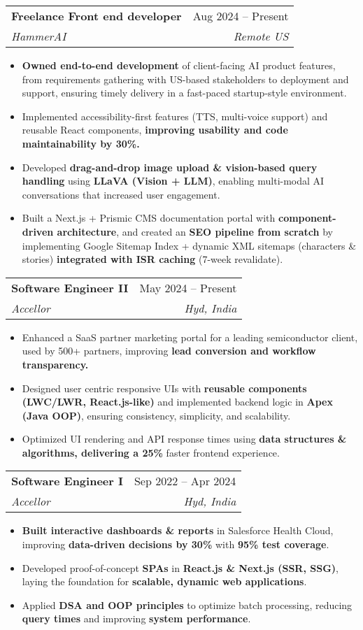 \documentclass[letterpaper,11pt]{article}
\makeatletter
\newcommand{\resumeItem}[1]{
  \item\small{
    {#1 \vspace{-2pt}}
  }
}
\newcommand{\resumeSubheading}[4]{
  \vspace{-2pt}\item
    \begin{tabular*}{0.97\textwidth}[t]{l@{\extracolsep{\fill}}r}
      \textbf{#1} & #2 \\
      \textit{\small#3} & \textit{\small #4} \\
    \end{tabular*}\vspace{-7pt}
}
\newcommand{\resumeSubSubheading}[2]{
    \item
    \begin{tabular*}{0.97\textwidth}{l@{\extracolsep{\fill}}r}
      \textit{\small#1} & \textit{\small #2} \\
    \end{tabular*}\vspace{-7pt}
}
\newcommand{\resumeSubHeadingListEnd}{\end{itemize}}
\newcommand{\resumeItemListStart}{\begin{itemize}}
\newcommand{\resumeItemListEnd}{\end{itemize}\vspace{-5pt}}
\makeatother
\begin{document}
    \resumeSubheading
      {Freelance Front end developer}{Aug 2024 -- Present}
      {HammerAI}{Remote US}
      \resumeItemListStart
        \resumeItem{\textbf{Owned end-to-end development} of client-facing AI product features, from requirements gathering with US-based stakeholders to deployment and support, ensuring timely delivery in a fast-paced startup-style environment.}
        \resumeItem{Implemented accessibility-first features (TTS, multi-voice support) and reusable React components, \textbf{improving usability and code maintainability by 30\%.}}
        \resumeItem{Developed \textbf{drag-and-drop image upload \& vision-based query handling} using \textbf{LLaVA (Vision + LLM)}, enabling multi-modal AI conversations that increased user engagement.}
        \resumeItem{Built a Next.js + Prismic CMS documentation portal with \textbf{component-driven architecture}, and created an \textbf{SEO pipeline from scratch} by implementing Google Sitemap Index + dynamic XML sitemaps (characters \& stories) \textbf{integrated with ISR caching} (7-week revalidate).}
     \resumeItemListEnd
    \resumeSubheading
      {Software Engineer II}{May 2024 -- Present}
      {Accellor}{Hyd, India}
      \resumeItemListStart
        \resumeItem{Enhanced a SaaS partner marketing portal for a leading semiconductor client, used by 500+ partners, improving \textbf{lead conversion and workflow transparency.}}
        \resumeItem{Designed user centric responsive UIs with \textbf{reusable components (LWC/LWR, React.js-like)} and implemented backend logic in \textbf{Apex (Java OOP)}, ensuring consistency, simplicity, and scalability.}
        \resumeItem{Optimized UI rendering and API response times using \textbf{data structures \& algorithms, delivering a 25\%} faster frontend experience.}
     \resumeItemListEnd
    \resumeSubheading
  {Software Engineer I}{Sep 2022 -- Apr 2024}
  {Accellor}{Hyd, India}
  \resumeItemListStart
    \resumeItem{\textbf{Built interactive dashboards \& reports} in Salesforce Health Cloud, improving \textbf{data-driven decisions by 30\%} with \textbf{95\% test coverage}.}
    \resumeItem{Developed proof-of-concept \textbf{SPAs} in \textbf{React.js \& Next.js (SSR, SSG)}, laying the foundation for \textbf{scalable, dynamic web applications}.}
    \resumeItem{Applied \textbf{DSA and OOP principles} to optimize batch processing, reducing \textbf{query times} and improving \textbf{system performance}.}
  \resumeItemListEnd
\end{document}
